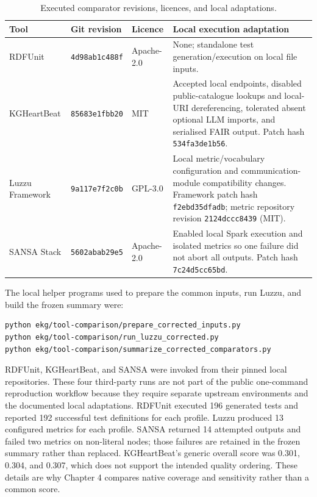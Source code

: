 \begin{table}[htbp]
\centering
\scriptsize
\caption{Executed comparator revisions, licences, and local adaptations.}
\label{tab:appendix_comparator_versions}
\begin{tabularx}{\textwidth}{>{\raggedright\arraybackslash}p{2.0cm}>{\raggedright\arraybackslash}p{3.1cm}>{\raggedright\arraybackslash}p{1.5cm}X}
\toprule
Tool & Git revision & Licence & Local execution adaptation \\
\midrule
RDFUnit & \texttt{4d98ab1c488f} & Apache-2.0 & None; standalone test generation/execution on local file inputs. \\
KGHeartBeat & \texttt{85683e1fbb20} & MIT & Accepted local endpoints, disabled public-catalogue lookups and local-URI dereferencing, tolerated absent optional LLM imports, and serialised FAIR output. Patch hash \texttt{534fa3de1b56}. \\
Luzzu Framework & \texttt{9a117e7f2c0b} & GPL-3.0 & Local metric/vocabulary configuration and communication-module compatibility changes. Framework patch hash \texttt{f2ebd35dfadb}; metric repository revision \texttt{2124dccc8439} (MIT). \\
SANSA Stack & \texttt{5602abab29e5} & Apache-2.0 & Enabled local Spark execution and isolated metrics so one failure did not abort all outputs. Patch hash \texttt{7c24d5cc65bd}. \\
\bottomrule
\end{tabularx}
\end{table}

The local helper programs used to prepare the common inputs, run Luzzu, and build the frozen summary were:

\begin{verbatim}
python ekg/tool-comparison/prepare_corrected_inputs.py
python ekg/tool-comparison/run_luzzu_corrected.py
python ekg/tool-comparison/summarize_corrected_comparators.py
\end{verbatim}

RDFUnit, KGHeartBeat, and SANSA were invoked from their pinned local repositories. These four third-party runs are not part of the public one-command reproduction workflow because they require separate upstream environments and the documented local adaptations. RDFUnit executed 196 generated tests and reported 192 successful test definitions for each profile. Luzzu produced 13 configured metrics for each profile. SANSA returned 14 attempted outputs and failed two metrics on non-literal nodes; those failures are retained in the frozen summary rather than replaced. KGHeartBeat's generic overall score was 0.301, 0.304, and 0.307, which does not support the intended quality ordering. These details are why Chapter 4 compares native coverage and sensitivity rather than a common score.

